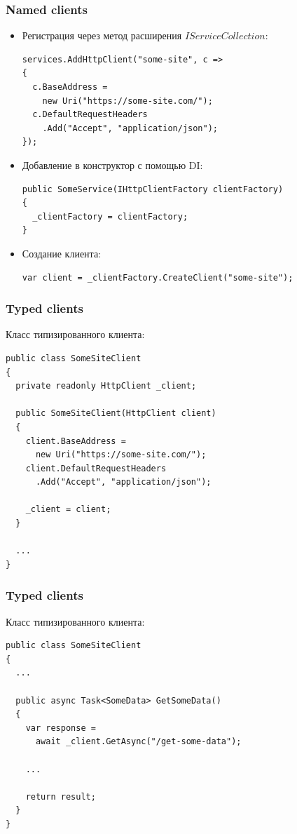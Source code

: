 \documentclass{beamer}
\begin{document}
\begin{frame}[fragile]
\frametitle{Named clients}
\begin{itemize}
\item<1-> Регистрация через метод расширения $IServiceCollection$:
\begin{lstlisting}
services.AddHttpClient("some-site", c =>
{
  c.BaseAddress = 
    new Uri("https://some-site.com/");
  c.DefaultRequestHeaders
    .Add("Accept", "application/json");
});
\end{lstlisting}
\item<2-> Добавление в конструктор с помощью DI:
\begin{lstlisting}
public SomeService(IHttpClientFactory clientFactory)
{
  _clientFactory = clientFactory;
}
\end{lstlisting}
\item<3-> Создание клиента:
\begin{lstlisting}
var client = _clientFactory.CreateClient("some-site");
\end{lstlisting}
\end{itemize}
\end{frame}

\begin{frame}[fragile]
\frametitle{Typed clients}
Класс типизированного клиента:
\begin{lstlisting}
public class SomeSiteClient
{
  private readonly HttpClient _client;

  public SomeSiteClient(HttpClient client)
  {
    client.BaseAddress = 
      new Uri("https://some-site.com/");
    client.DefaultRequestHeaders
      .Add("Accept", "application/json");

    _client = client;
  }
    
  ...
}
\end{lstlisting}
\end{frame}

\begin{frame}[fragile]
\frametitle{Typed clients}
Класс типизированного клиента:
\begin{lstlisting}
public class SomeSiteClient
{
  ...

  public async Task<SomeData> GetSomeData()
  {
    var response = 
      await _client.GetAsync("/get-some-data");

    ...

    return result;
  }
}
\end{lstlisting}
\end{frame}
\end{document}
